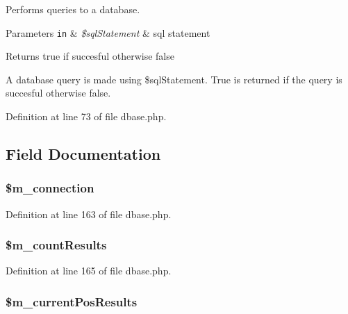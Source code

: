 Performs queries to a database. 


\begin{DoxyParams}[1]{Parameters}
\mbox{\tt in}  & {\em \$sql\+Statement} & sql statement \\
\hline
\end{DoxyParams}
\begin{DoxyReturn}{Returns}
true if succesful otherwise false
\end{DoxyReturn}
A database query is made using \$sql\+Statement. True is returned if the query is succesful otherwise false.  

Definition at line 73 of file dbase.\+php.



\subsection{Field Documentation}
\hypertarget{class_c_dbase_abace9b0ce64d6ce2302e4b17855f9a10}{
\subsubsection[{\$m\+\_\+connection}]{\setlength{\rightskip}{0pt plus 5cm}\$m\+\_\+connection\hspace{0.3cm}{\ttfamily [private]}}}\label{class_c_dbase_abace9b0ce64d6ce2302e4b17855f9a10}


Definition at line 163 of file dbase.\+php.

\hypertarget{class_c_dbase_a52789ec4ae56b94c2965fdd4798c6af0}{
\subsubsection[{\$m\+\_\+count\+Results}]{\setlength{\rightskip}{0pt plus 5cm}\$m\+\_\+count\+Results\hspace{0.3cm}{\ttfamily [private]}}}\label{class_c_dbase_a52789ec4ae56b94c2965fdd4798c6af0}


Definition at line 165 of file dbase.\+php.

\hypertarget{class_c_dbase_a34b634ed9ae0e2e303eb5370c8abf5e3}{
\subsubsection[{\$m\+\_\+current\+Pos\+Results}]{\setlength{\rightskip}{0pt plus 5cm}\$m\+\_\+current\+Pos\+Results\hspace{0.3cm}{\ttfamily [private]}}}\label{class_c_dbase_a34b634ed9ae0e2e303eb5370c8abf5e3}


